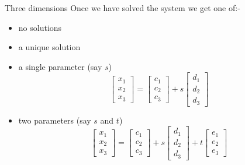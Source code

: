 \documentclass{beamer}
\begin{document}
\begin{frame}{Three dimensions}
  Once we have solved the system we get one of:-
  \begin{itemize}
  \item no solutions
  \item a unique solution
  \item a single parameter (say $s$)
    \begin{equation*}
      \left[
	\begin{array}{c}
          x_1\\
          x_2\\
          x_3
	\end{array}
      \right]= \left[
	\begin{array}{c}
          c_1\\
          c_2\\
          c_3
	\end{array}
      \right]+s \left[
	\begin{array}{c}
          d_1\\
          d_2\\
          d_3
	\end{array}
      \right]
    \end{equation*}
     \item two parameters (say $s$ and $t$)
    \begin{equation*}
      \left[
	\begin{array}{c}
          x_1\\
          x_2\\
          x_3
	\end{array}
      \right]= \left[
	\begin{array}{c}
          c_1\\
          c_2\\
          c_3
	\end{array}
      \right]+s \left[
	\begin{array}{c}
          d_1\\
          d_2\\
          d_3
	\end{array}
      \right]+ t \left[
	\begin{array}{c}
          e_1\\
          e_2\\
          e_3
	\end{array}
      \right]
    \end{equation*}
  \end{itemize}
\end{frame}
\end{document}
